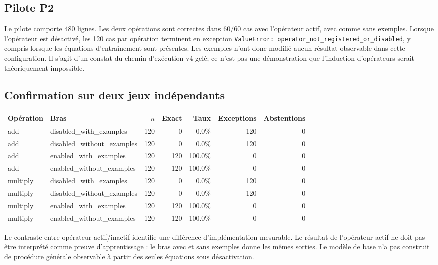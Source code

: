 \documentclass[11pt,a4paper]{article}
\begin{document}
\subsection{Pilote P2}
Le pilote comporte 480 lignes. Les deux opérations sont correctes dans 60/60 cas avec l’opérateur actif, avec comme sans exemples. Lorsque l’opérateur est désactivé, les 120 cas par opération terminent en exception \texttt{ValueError: operator\_not\_registered\_or\_disabled}, y compris lorsque les équations d’entraînement sont présentes. Les exemples n’ont donc modifié aucun résultat observable dans cette configuration. Il s’agit d’un constat du chemin d’exécution v4 gelé; ce n’est pas une démonstration que l’induction d’opérateurs serait théoriquement impossible.

\subsection{Confirmation sur deux jeux indépendants}
\scriptsize\setlength{\tabcolsep}{2pt}
\begin{longtable}{p{}p{}rrrrr}
\toprule Opération & Bras & $n$ & Exact & Taux & Exceptions & Abstentions \\
\midrule

add & disabled\_with\_examples & 120 & 0 & 0.0\% & 120 & 0 \\
add & disabled\_without\_examples & 120 & 0 & 0.0\% & 120 & 0 \\
add & enabled\_with\_examples & 120 & 120 & 100.0\% & 0 & 0 \\
add & enabled\_without\_examples & 120 & 120 & 100.0\% & 0 & 0 \\
multiply & disabled\_with\_examples & 120 & 0 & 0.0\% & 120 & 0 \\
multiply & disabled\_without\_examples & 120 & 0 & 0.0\% & 120 & 0 \\
multiply & enabled\_with\_examples & 120 & 120 & 100.0\% & 0 & 0 \\
multiply & enabled\_without\_examples & 120 & 120 & 100.0\% & 0 & 0 \\
\bottomrule
\end{longtable}
\normalsize\setlength{\tabcolsep}{6pt}

Le contraste entre opérateur actif/inactif identifie une différence d’implémentation mesurable. Le résultat de l’opérateur actif ne doit pas être interprété comme preuve d’apprentissage : le bras avec et sans exemples donne les mêmes sorties. Le modèle de base n’a pas construit de procédure générale observable à partir des seules équations sous désactivation.
\end{document}
